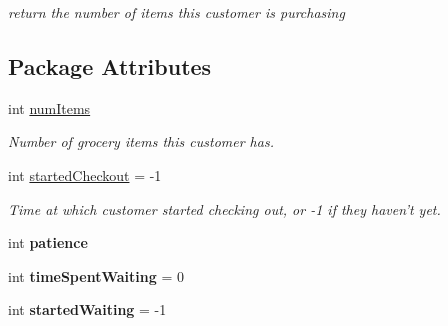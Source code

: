 \begin{CompactItemize}
\begin{CompactList}\small\item\em return the number of items this customer is purchasing \item\end{CompactList}\end{CompactItemize}
\subsection*{Package Attributes}
\begin{CompactItemize}
\item 
\hypertarget{class_customer_d7463824c52b73b3a4f772f4ba3c902a}{
int \hyperlink{class_customer_d7463824c52b73b3a4f772f4ba3c902a}{numItems}}
\label{class_customer_d7463824c52b73b3a4f772f4ba3c902a}

\begin{CompactList}\small\item\em Number of grocery items this customer has. \item\end{CompactList}\item 
\hypertarget{class_customer_a9a95ed206f0a4109a7febe14f804ade}{
int \hyperlink{class_customer_a9a95ed206f0a4109a7febe14f804ade}{startedCheckout} = -1}
\label{class_customer_a9a95ed206f0a4109a7febe14f804ade}

\begin{CompactList}\small\item\em Time at which customer started checking out, or -1 if they haven't yet. \item\end{CompactList}\item 
\hypertarget{class_customer_cb7bd88d43fa7d70b7919516fa2859b6}{
int \textbf{patience}}
\label{class_customer_cb7bd88d43fa7d70b7919516fa2859b6}

\item 
\hypertarget{class_customer_7e77803d36a36759913b48a2024b6e11}{
int \textbf{timeSpentWaiting} = 0}
\label{class_customer_7e77803d36a36759913b48a2024b6e11}

\item 
\hypertarget{class_customer_b61cc98516fe2e291eb545745e00f225}{
int \textbf{startedWaiting} = -1}
\label{class_customer_b61cc98516fe2e291eb545745e00f225}

\end{CompactItemize}
